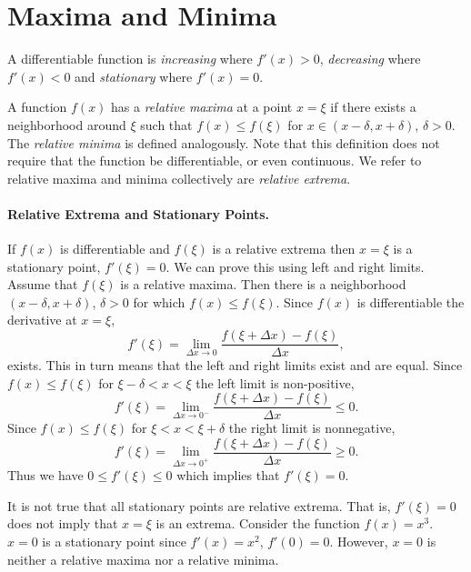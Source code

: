 \section{Maxima and Minima}

A differentiable function is \textit{increasing} where $f'(x) > 0$, 
\textit{decreasing} where $f'(x) < 0$ and \textit{stationary}
where $f'(x) = 0$.

A function $f(x)$ has a \textit{relative maxima} at a point $x = \xi$ if
there exists a neighborhood around $\xi$ such that $f(x) \leq f(\xi)$ for 
$x \in (x - \delta, x + \delta)$, $\delta > 0$.  The \textit{relative 
  minima} is defined analogously.  Note that this definition does not 
require that the function be differentiable, or even continuous.
We refer to relative maxima and minima collectively are \textit{relative
  extrema}.



\paragraph{Relative Extrema and Stationary Points.}
If $f(x)$ is differentiable and $f(\xi)$ is a relative extrema then
$x=\xi$ is a stationary point, $f'(\xi) = 0$.  We can prove this
using left and right limits.  Assume that $f(\xi)$ is a relative maxima.
Then there is a neighborhood $(x - \delta, x + \delta)$, $\delta > 0$ for 
which $f(x) \leq f(\xi)$.  Since $f(x)$ is differentiable the derivative
at $x = \xi$,
\[
f'(\xi) = \lim_{\Delta x \to 0} \frac{f(\xi + \Delta x) - f(\xi)}{\Delta x},
\]
exists.  This in turn means that the left and right limits exist and 
are equal.  Since $f(x) \leq f(\xi)$ for $\xi-\delta < x < \xi$ the left
limit is non-positive,
\[
f'(\xi) = \lim_{\Delta x \to 0^-} \frac{ f(\xi + \Delta x) - f(\xi) }
{ \Delta x } \leq 0.
\]
Since $f(x) \leq f(\xi)$ for $\xi < x < \xi + \delta$ the right
limit is nonnegative,
\[
f'(\xi) = \lim_{\Delta x \to 0^+} \frac{ f(\xi + \Delta x) - f(\xi) }
{ \Delta x } \geq 0.
\]
Thus we have $0 \leq f'(\xi) \leq 0$ which implies that $f'(\xi) = 0$.


It is not true that all stationary points are relative extrema.  That is,
$f'(\xi) = 0$ does not imply that $x = \xi$ is an extrema.  Consider the
function $f(x) = x^3$.  $x = 0$ is a stationary point since $f'(x) = x^2$,
$f'(0) = 0$.  However, $x = 0$ is neither a relative maxima nor a 
relative minima.



